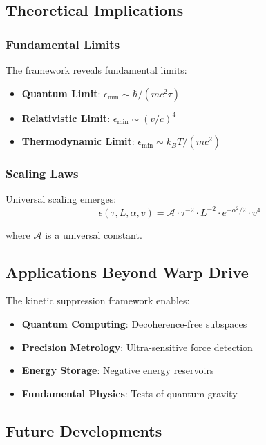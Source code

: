 \subsection{Theoretical Implications}

\subsubsection{Fundamental Limits}

The framework reveals fundamental limits:
\begin{itemize}
\item \textbf{Quantum Limit}: $\epsilon_{\min} \sim \hbar/(m c^2 \tau)$ 
\item \textbf{Relativistic Limit}: $\epsilon_{\min} \sim (v/c)^4$
\item \textbf{Thermodynamic Limit}: $\epsilon_{\min} \sim k_B T/(m c^2)$
\end{itemize}

\subsubsection{Scaling Laws}

Universal scaling emerges:
\begin{equation}
\epsilon(\tau, L, \alpha, v) = \mathcal{A} \cdot \tau^{-2} \cdot L^{-2} \cdot e^{-\alpha^2/2} \cdot v^4
\end{equation}

where $\mathcal{A}$ is a universal constant.

\subsection{Applications Beyond Warp Drive}

The kinetic suppression framework enables:
\begin{itemize}
\item \textbf{Quantum Computing}: Decoherence-free subspaces
\item \textbf{Precision Metrology}: Ultra-sensitive force detection
\item \textbf{Energy Storage}: Negative energy reservoirs
\item \textbf{Fundamental Physics}: Tests of quantum gravity
\end{itemize}

\subsection{Future Developments}

